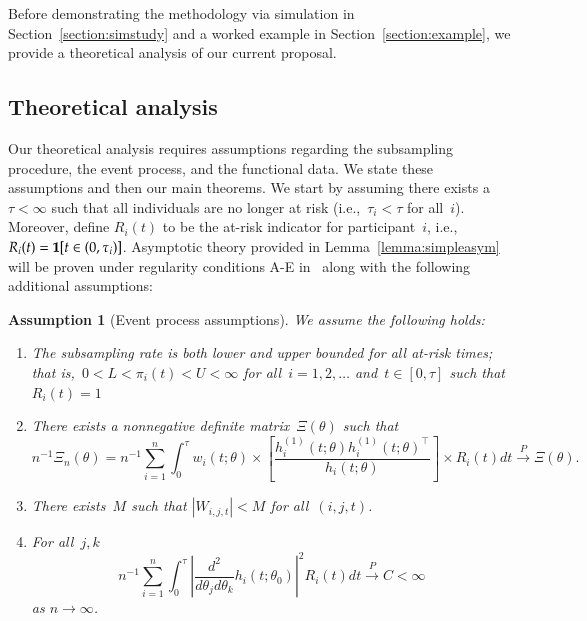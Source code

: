 \documentclass[12pt]{amsart}
\newtheorem{assumption}[thm]{Assumption}
\begin{document}
\noindent Before demonstrating the methodology via simulation in Section~\ref{section:simstudy} and a worked example in Section~\ref{section:example}, we provide a theoretical analysis of our current proposal.


\subsection{Theoretical analysis}

Our theoretical analysis requires assumptions regarding the subsampling procedure, the event process, and the functional data. We state these assumptions and then our main theorems. We start by assuming there exists a~$\tau < \infty$ such that all individuals are no longer at risk (i.e.,~$\tau_i < \tau$ for all~$i$). Moreover, define $R_i (t)$ to be the at-risk indicator for participant~$i$, i.e., $R_i (t) = {\bf 1} [t \in (0,\tau_i)]$. Asymptotic theory provided in Lemma~\ref{lemma:simpleasym} will be proven under regularity conditions A-E in~\cite[pp. 420--421]{Andersen1993} along with the following additional assumptions:

\begin{assumption}[Event process assumptions]
\label{assumption:events}\normalfont
We assume the following holds:
\begin{enumerate}[label=(E.\arabic*)]
\item\label{E1} The subsampling rate is both lower and upper bounded for all at-risk times; that is,~$0 < L < \pi_i (t) < U < \infty$ for all~$i=1,2,\ldots$ and~$t \in [0,\tau]$ such that $R_i (t) = 1$
\item\label{E2} There exists a nonnegative definite matrix~$\Xi (\theta)$ such that
  \[
    n^{-1} \Xi_n (\theta) = n^{-1} \sum_{i=1}^n \int_0^\tau w_i (t; \theta) \times \left[ \frac{h_i^{(1)}(t; \theta) h_i^{(1)} (t;\theta)^\top}{h_i (t; \theta)} \right] \times   R_i (t) dt \overset{P}{\to} \Xi (\theta).
  \]
\item\label{E3} There exists~$M$ such that $|W_{i,j,t}| < M$ for all~$(i,j,t)$.
\item\label{E4} For all~$j,k$
\[
n^{-1} \sum_{i=1}^n \int_0^\tau \left | \frac{d^2}{d\theta_j
    d\theta_k} h_i (t;\theta_0) \right|^2 R_i (t) dt \overset{P}{\to}
C < \infty
\]
as $n \to \infty$.
\end{enumerate}
\end{assumption}
\end{document}
